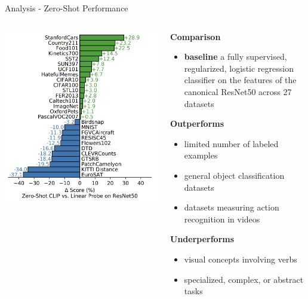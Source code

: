 \documentclass[aspectratio=169,xcolor=dvipsnames]{beamer}
\begin{document}
\begin{frame}{Analysis - Zero-Shot Performance}
\begin{columns}
    \begin{column}{0.48\textwidth}
    \includegraphics[width=\textwidth]{figures/zero_shot_fully_supervised_baseline.png}
    \end{column}

    \begin{column}{0.5\textwidth}
        \textbf{Comparison}\\
        \begin{itemize}
            \item \textbf{baseline} a fully supervised, regularized, logistic regression classifier on the features of the canonical ResNet50 across 27 datasets
        \end{itemize}
        \textbf{Outperforms}\\
        \begin{itemize}
            \item limited number of labeled examples
            \item general object classification datasets
            \item datasets measuring action recognition in videos
        \end{itemize}
        \textbf{Underperforms}\\
        \begin{itemize}
            \item visual concepts involving verbs
            \item specialized, complex, or abstract tasks
        \end{itemize}
\end{column}
\end{columns}
\end{frame}
\end{document}
